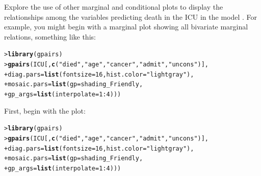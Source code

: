 \documentclass[10pt]{report}\usepackage[]{graphicx}\usepackage[]{color}
\makeatletter
\newcommand{\hlnum}[1]{\textcolor[rgb]{0.686,0.059,0.569}{#1}}%
\newcommand{\hlstr}[1]{\textcolor[rgb]{0.192,0.494,0.8}{#1}}%
\newcommand{\hlopt}[1]{\textcolor[rgb]{0,0,0}{#1}}%
\newcommand{\hlstd}[1]{\textcolor[rgb]{0.345,0.345,0.345}{#1}}%
\newcommand{\hlkwc}[1]{\textcolor[rgb]{0.333,0.667,0.333}{#1}}%
\newcommand{\hlkwd}[1]{\textcolor[rgb]{0.737,0.353,0.396}{\textbf{#1}}}%
\newenvironment{kframe}{%
 \def\at@end@of@kframe{}%
 \ifinner\ifhmode%
  \def\at@end@of@kframe{\end{minipage}}%
  \begin{minipage}{\columnwidth}%
 \fi\fi%
 \def\FrameCommand##1{\hskip\@totalleftmargin \hskip-\fboxsep
 \colorbox{shadecolor}{##1}\hskip-\fboxsep
     \hskip-\linewidth \hskip-\@totalleftmargin \hskip\columnwidth}%
 \MakeFramed {\advance\hsize-\width
   \@totalleftmargin\z@ \linewidth\hsize
   \@setminipage}}%
 {\par\unskip\endMakeFramed%
 \at@end@of@kframe}
\newenvironment{knitrout}{}{} %
\renewenvironment{knitrout}{\small\renewcommand{\baselinestretch}{.85}}{} %
\makeatother
\begin{document}
\begin{Exercises}
\exercise Explore the use of other marginal and conditional plots to display the relationships
among the variables predicting death in the ICU in the model .
For example, you might begin with a marginal  plot showing all bivariate
marginal relations, something like this:
\begin{knitrout}\footnotesize
{}\color{fgcolor}\begin{kframe}
\begin{alltt}
\hlstd{> }\hlkwd{library}\hlstd{(gpairs)}
\hlstd{> }\hlkwd{gpairs}\hlstd{(ICU[,}\hlkwd{c}\hlstd{(}\hlstr{"died"}\hlstd{,} \hlstr{"age"}\hlstd{,} \hlstr{"cancer"}\hlstd{,} \hlstr{"admit"}\hlstd{,} \hlstr{"uncons"}\hlstd{)],}
\hlstd{+ }  \hlkwc{diag.pars}\hlstd{=}\hlkwd{list}\hlstd{(}\hlkwc{fontsize}\hlstd{=}\hlnum{16}\hlstd{,} \hlkwc{hist.color}\hlstd{=}\hlstr{"lightgray"}\hlstd{),}
\hlstd{+ }  \hlkwc{mosaic.pars}\hlstd{=}\hlkwd{list}\hlstd{(}\hlkwc{gp}\hlstd{=shading_Friendly,}
\hlstd{+ }                   \hlkwc{gp_args}\hlstd{=}\hlkwd{list}\hlstd{(}\hlkwc{interpolate}\hlstd{=}\hlnum{1}\hlopt{:}\hlnum{4}\hlstd{)))}
\end{alltt}
\end{kframe}
\end{knitrout}
	\begin{ans}
  First, begin with the  plot:
\begin{knitrout}\footnotesize
{}\color{fgcolor}\begin{kframe}
\begin{alltt}
\hlstd{> }\hlkwd{library}\hlstd{(gpairs)}
\hlstd{> }\hlkwd{gpairs}\hlstd{(ICU[,}\hlkwd{c}\hlstd{(}\hlstr{"died"}\hlstd{,} \hlstr{"age"}\hlstd{,} \hlstr{"cancer"}\hlstd{,} \hlstr{"admit"}\hlstd{,} \hlstr{"uncons"}\hlstd{)],}
\hlstd{+ }  \hlkwc{diag.pars}\hlstd{=}\hlkwd{list}\hlstd{(}\hlkwc{fontsize}\hlstd{=}\hlnum{16}\hlstd{,} \hlkwc{hist.color}\hlstd{=}\hlstr{"lightgray"}\hlstd{),}
\hlstd{+ }  \hlkwc{mosaic.pars}\hlstd{=}\hlkwd{list}\hlstd{(}\hlkwc{gp}\hlstd{=shading_Friendly,}
\hlstd{+ }                   \hlkwc{gp_args}\hlstd{=}\hlkwd{list}\hlstd{(}\hlkwc{interpolate}\hlstd{=}\hlnum{1}\hlopt{:}\hlnum{4}\hlstd{)))}
\end{alltt}
\end{kframe}


\end{knitrout}
\end{ans}
\end{Exercises}
\end{document}
